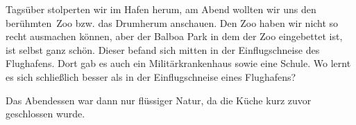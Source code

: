
\vspace*{.38\paperheight}

Tagsüber stolperten wir im Hafen herum, am Abend wollten wir uns den \glqq berühmten\grqq \, Zoo bzw. das Drumherum anschauen.
Den Zoo haben wir nicht so recht ausmachen können, aber der Balboa Park in dem der Zoo eingebettet ist, ist selbst ganz schön.
Dieser befand sich mitten in der Einflugschneise des Flughafens.
Dort gab es auch ein Militärkrankenhaus sowie eine Schule.
Wo lernt es sich schließlich besser als in der Einflugschneise eines Flughafens?

Das Abendessen war dann nur flüssiger Natur, da die Küche kurz zuvor geschlossen wurde.
\newpage